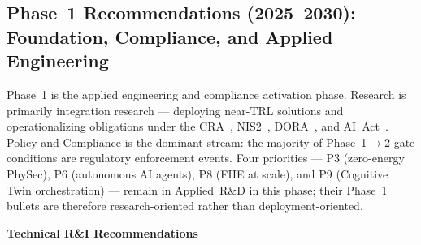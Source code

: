 \subsection*{Phase~1 Recommendations (2025--2030):
             Foundation, Compliance, and Applied Engineering}

Phase~1 is the applied engineering and compliance activation phase.
Research is primarily integration research --- deploying near-TRL solutions
and operationalizing obligations under the CRA~\cite{cra},
NIS2~\cite{nis2}, DORA~\cite{dora}, and AI~Act~\cite{aiact}.
Policy and Compliance is the dominant stream: the majority of
Phase~1$\to$2 gate conditions are regulatory enforcement events.
Four priorities --- P3 (zero-energy PhySec), P6 (autonomous AI agents),
P8 (FHE at scale), and P9 (Cognitive Twin orchestration) --- remain
in Applied~R\&D in this phase; their Phase~1 bullets are therefore
research-oriented rather than deployment-oriented.

\textbf{Technical R\&I Recommendations}

